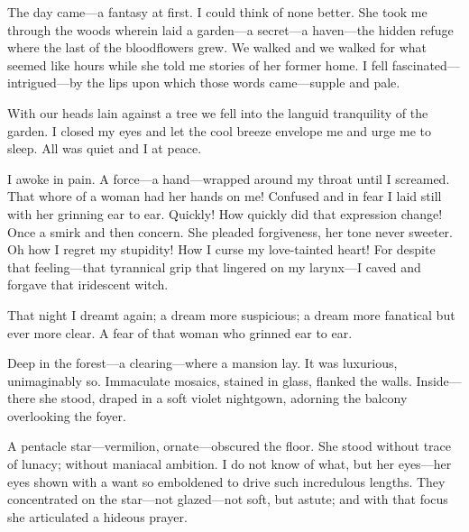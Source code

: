 \documentclass{article}
\begin{document}
\noindent %
The day came---a fantasy at first.
I could think of none better. %
She took me through the woods wherein laid a garden---a
secret---a haven---the hidden refuge where
the last of the bloodflowers grew.
We walked and we walked for what seemed like hours
while she told me stories of her former home.
I fell fascinated---intrigued---by the lips
upon which those words came---supple and pale.


With our heads lain against a tree we
fell into the languid tranquility of the garden.
I closed my eyes and let the cool breeze envelope me
and urge me to sleep. All was quiet and I at peace.


I awoke in pain.
A force---a hand---wrapped around my throat until I screamed.
That whore of a woman had her hands on me!
Confused and in fear I laid still
with her grinning ear to ear.
Quickly! How quickly did that expression change!
Once a smirk and then concern.
She pleaded forgiveness, her tone never sweeter.
Oh how I regret my stupidity!
How I curse my love-tainted heart!
For despite that feeling---that
tyrannical grip that lingered on my larynx---I
caved and forgave that iridescent witch.


That night I dreamt again; a dream more suspicious;
a dream more fanatical but ever more clear.
A fear of that woman who grinned ear to ear. %
\vvvv


\noindent
Deep in the forest---a clearing---where a mansion lay.
It was luxurious, unimaginably so.
Immaculate mosaics, stained in glass, flanked the walls.
Inside---there she stood, draped in a soft violet nightgown,
adorning the balcony overlooking the foyer.


A pentacle star---vermilion, ornate---obscured the floor.
She stood without trace of lunacy;
without maniacal ambition.
I do not know of what, but her eyes---her eyes
shown with a want so emboldened to drive
such incredulous lengths.
They concentrated on the star---not
glazed---not soft, but astute; and with
that focus she articulated a hideous prayer.
\VV
\end{document}

